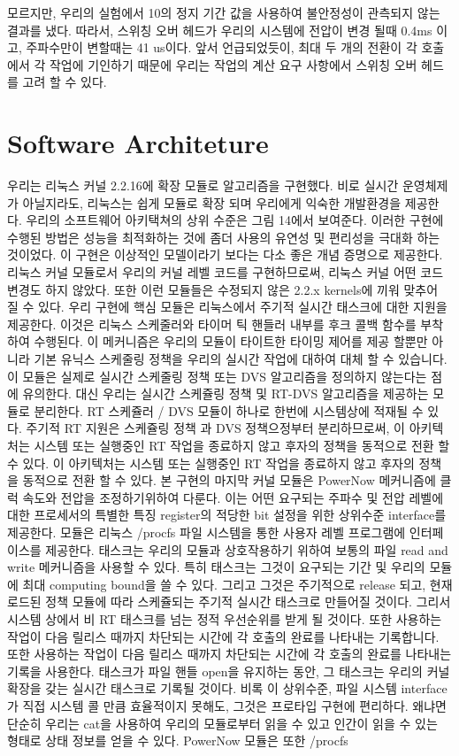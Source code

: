 \documentclass[11pt
  , a4paper
  , article
  , oneside
]{memoir}
\begin{document}
모르지만, 우리의 실험에서 10의 정지 기간 값을 사용하여 불안정성이 관측되지 않는 결과를 냈다. 따라서, 스위칭 오버 헤드가 우리의 시스템에 전압이 변경 될때 0.4ms 이고, 주파수만이 변할때는 41 us이다. 앞서 언급되었듯이, 최대 두 개의 전환이 각 호출에서 각 작업에 기인하기 때문에 우리는 작업의 계산 요구 사항에서 스위칭 오버 헤드를 고려 할 수 있다.

\section{Software Architeture}
우리는 리눅스 커널 2.2.16에 확장 모듈로 알고리즘을 구현했다. 비로 실시간 운영체제가 아닐지라도, 리눅스는 쉽게 모듈로 확장 되며 우리에게 익숙한 개발환경을 제공한다. 우리의 소프트웨어 아키택쳐의 상위 수준은 그림 14에서 보여준다. 이러한 구현에 수행된 방법은 성능을 최적화하는 것에 좀더 사용의 유연성 및 편리성을 극대화 하는 것이었다. 이 구현은 이상적인 모델이라기 보다는 다소 좋은 개념 증명으로 제공한다. 리눅스 커널 모듈로서 우리의 커널 레벨 코드를 구현하므로써, 리눅스 커널 어떤 코드 변경도 하지 않았다. 또한 이런 모듈들은 수정되지 않은 2.2.x kernels에 끼워 맞추어 질 수 있다. 우리 구현에 핵심 모듈은 리눅스에서 주기적 실시간 태스크에 대한 지원을 제공한다. 이것은 리눅스 스케줄러와 타이머 틱 핸들러 내부를 후크 콜백 함수를 부착하여 수행된다. 이 메커니즘은 우리의 모듈이 타이트한 타이밍 제어를 제공 할뿐만 아니라 기본 유닉스 스케줄링 정책을 우리의 실시간 작업에 대하여 대체 할 수 있습니다. 이 모듈은 실제로 실시간 스케줄링 정책 또는 DVS 알고리즘을 정의하지 않는다는 점에 유의한다. 대신 우리는 실시간 스케쥴링 정책 및 RT-DVS 알고리즘을 제공하는 모듈로 분리한다. RT 스케쥴러 / DVS 모듈이 하나로 한번에 시스템상에 적재될 수 있다. 주기적 RT 지원은 스케쥴링 정책 과 DVS 정책으정부터 분리하므로써, 이 아키텍처는 시스템 또는 실행중인 RT 작업을 종료하지 않고 후자의 정책을 동적으로 전환 할 수 있다. 이 아키텍처는 시스템 또는 실행중인 RT 작업을 종료하지 않고 후자의 정책을 동적으로 전환 할 수 있다. 본 구현의 마지막 커널 모듈은 PowerNow 메커니즘에 클럭 속도와 전압을 조정하기위하여 다룬다. 이는 어떤 요구되는 주파수 및 전압 레벨에 대한 프로세서의 특별한 특징 register의 적당한 bit 설정을 위한 상위수준 interface를 제공한다. 모듈은 리눅스 /procfs 파일 시스템을 통한 사용자 레벨 프로그램에 인터페이스를 제공한다. 태스크는 우리의 모듈과 상호작용하기 위하여 보통의 파일 read and write 메커니즘을 사용할 수 있다. 특히 태스크는 그것이 요구되는 기간 및 우리의 모듈에 최대 computing bound을 쓸 수 있다. 그리고 그것은 주기적으로 release 되고, 현재 로드된 정책 모듈에 따라 스케쥴되는 주기적 실시간 태스크로 만들어질 것이다. 그리서 시스템 상에서 비 RT 태스크를 넘는 정적 우선순위를 받게 될 것이다. 또한 사용하는 작업이 다음 릴리스 때까지 차단되는 시간에 각 호출의 완료를 나타내는 기록합니다. 또한 사용하는 작업이 다음 릴리스 때까지 차단되는 시간에 각 호출의 완료를 나타내는 기록을 사용한다. 태스크가 파일 핸들 open을 유지하는 동안, 그 태스크는 우리의 커널 확장을 갖는 실시간 태스크로 기록될 것이다. 비록 이 상위수준, 파일 시스템 interface가 직접 시스템 콜 만큼 효율적이지 못해도, 그것은 프로타입 구현에 편리하다. 왜냐면 단순히 우리는 cat을 사용하여 우리의 모듈로부터 읽을 수 있고 인간이 읽을 수 있는 형태로 상태 정보를 얻을 수 있다. PowerNow 모듈은 또한 /procfs 
\end{document}
